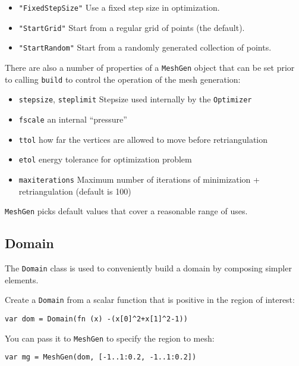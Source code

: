 \begin{itemize}

\item
  \texttt{"FixedStepSize"} Use a fixed step size in optimization.
\item
  \texttt{"StartGrid"} Start from a regular grid of points (the
  default).
\item
  \texttt{"StartRandom"} Start from a randomly generated collection of
  points.
\end{itemize}

There are also a number of properties of a \texttt{MeshGen} object that
can be set prior to calling \texttt{build} to control the operation of
the mesh generation:

\begin{itemize}

\item
  \texttt{stepsize}, \texttt{steplimit} Stepsize used internally by the
  \texttt{Optimizer}
\item
  \texttt{fscale} an internal ``pressure''
\item
  \texttt{ttol} how far the vertices are allowed to move before
  retriangulation
\item
  \texttt{etol} energy tolerance for optimization problem
\item
  \texttt{maxiterations} Maximum number of iterations of minimization +
  retriangulation (default is 100)
\end{itemize}

\texttt{MeshGen} picks default values that cover a reasonable range of
uses.

\hypertarget{domain}{%
\subsection{Domain}\label{domain}}

The \texttt{Domain} class is used to conveniently build a domain by
composing simpler elements.

Create a \texttt{Domain} from a scalar function that is positive in the
region of interest:

\begin{lstlisting}
var dom = Domain(fn (x) -(x[0]^2+x[1]^2-1))
\end{lstlisting}

You can pass it to \texttt{MeshGen} to specify the region to mesh:

\begin{lstlisting}
var mg = MeshGen(dom, [-1..1:0.2, -1..1:0.2])
\end{lstlisting}

